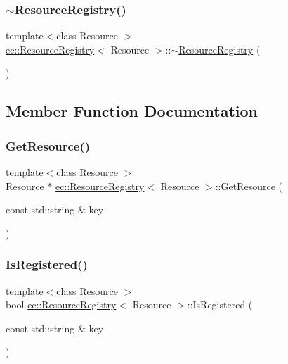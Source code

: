 \subsubsection{\texorpdfstring{$\sim$\+Resource\+Registry()}{~ResourceRegistry()}}
{\footnotesize\ttfamily template$<$class Resource $>$ \\
\mbox{\hyperlink{classec_1_1_resource_registry}{ec\+::\+Resource\+Registry}}$<$ Resource $>$\+::$\sim$\mbox{\hyperlink{classec_1_1_resource_registry}{Resource\+Registry}} (\begin{DoxyParamCaption}{ }\end{DoxyParamCaption})}



\subsection{Member Function Documentation}
\mbox{\label{classec_1_1_resource_registry_a8893154d25333cbf0feeb14f06bede67}} 
\subsubsection{\texorpdfstring{Get\+Resource()}{GetResource()}}
{\footnotesize\ttfamily template$<$class Resource $>$ \\
Resource $\ast$ \mbox{\hyperlink{classec_1_1_resource_registry}{ec\+::\+Resource\+Registry}}$<$ Resource $>$\+::Get\+Resource (\begin{DoxyParamCaption}\item[{const std\+::string \&}]{key }\end{DoxyParamCaption})}

\mbox{\label{classec_1_1_resource_registry_a9a56b5a31fb90469eabb372bf3327188}} 
\subsubsection{\texorpdfstring{Is\+Registered()}{IsRegistered()}\hspace{0.1cm}{\footnotesize\ttfamily [1/2]}}
{\footnotesize\ttfamily template$<$class Resource $>$ \\
bool \mbox{\hyperlink{classec_1_1_resource_registry}{ec\+::\+Resource\+Registry}}$<$ Resource $>$\+::Is\+Registered (\begin{DoxyParamCaption}\item[{const std\+::string \&}]{key }\end{DoxyParamCaption})}

